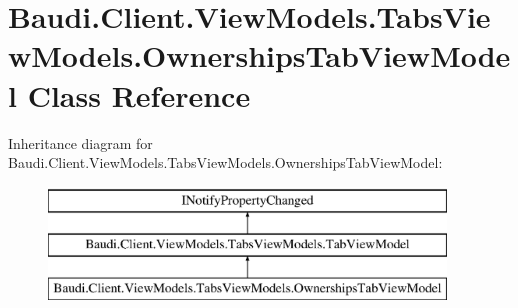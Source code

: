 \hypertarget{class_baudi_1_1_client_1_1_view_models_1_1_tabs_view_models_1_1_ownerships_tab_view_model}{}\section{Baudi.\+Client.\+View\+Models.\+Tabs\+View\+Models.\+Ownerships\+Tab\+View\+Model Class Reference}
\label{class_baudi_1_1_client_1_1_view_models_1_1_tabs_view_models_1_1_ownerships_tab_view_model}
Inheritance diagram for Baudi.\+Client.\+View\+Models.\+Tabs\+View\+Models.\+Ownerships\+Tab\+View\+Model\+:\begin{figure}[H]
\begin{center}
\leavevmode
\includegraphics[height=3.000000cm]{class_baudi_1_1_client_1_1_view_models_1_1_tabs_view_models_1_1_ownerships_tab_view_model}
\end{center}
\end{figure}

